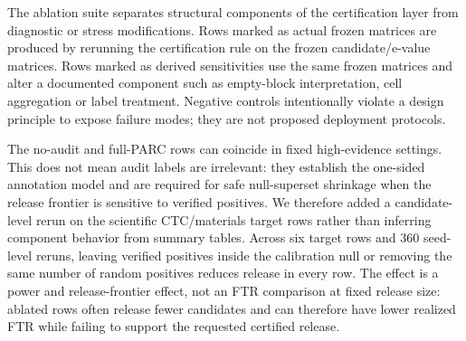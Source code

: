 \documentclass[11pt]{article}
\begin{document}
The ablation suite separates structural components of the certification layer from diagnostic or stress modifications.
Rows marked as actual frozen matrices are produced by rerunning the certification rule on the frozen candidate/e-value matrices.
Rows marked as derived sensitivities use the same frozen matrices and alter a documented component such as empty-block interpretation, cell aggregation or label treatment.
Negative controls intentionally violate a design principle to expose failure modes; they are not proposed deployment protocols.

\begin{table}[h]
\centering
\caption{Ablation summary used for the main-text component discussion. Conservative FTR values are label-uncertainty diagnostics.}
\small
{}
\end{table}

The no-audit and full-PARC rows can coincide in fixed high-evidence settings.
This does not mean audit labels are irrelevant: they establish the one-sided annotation model and are required for safe null-superset shrinkage when the release frontier is sensitive to verified positives.
We therefore added a candidate-level rerun on the scientific CTC/materials target rows rather than inferring component behavior from summary tables.
Across six target rows and 360 seed-level reruns, leaving verified positives inside the calibration null or removing the same number of random positives reduces release in every row.
The effect is a power and release-frontier effect, not an FTR comparison at fixed release size: ablated rows often release fewer candidates and can therefore have lower realized FTR while failing to support the requested certified release.
\end{document}

